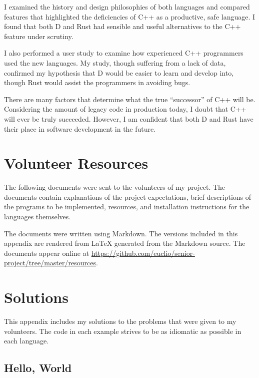 \documentclass[finalcopy]{srpaper}
\begin{document}
I examined the history and design philosophies of both languages and compared
features that highlighted the deficiencies of C++ as a productive, safe
language. I found that both D and Rust had sensible and useful alternatives to
the C++ feature under scrutiny.

I also performed a user study to examine how experienced C++ programmers
used the new languages. My study, though suffering from a lack of data,
confirmed my hypothesis that D would be easier to learn and develop into,
though Rust would assist the programmers in avoiding bugs.

There are many factors that determine what the true ``successor'' of C++ will
be. Considering the amount of legacy code in production today, I doubt that C++
will ever be truly succeeded. However, I am confident that both D and Rust have
their place in software development in the future.

\nocite{*}


\appendix \chapter{Volunteer Resources}\label{app:resources} The following
documents were sent to the volunteers of my project. The documents contain
explanations of the project expectations, brief descriptions of the programs to
be implemented, resources, and installation instructions for the languages
themselves.

The documents were written using Markdown. The versions included in this
appendix are rendered from \LaTeX{} generated from the Markdown source. The
documents appear online at
\url{https://github.com/euclio/senior-project/tree/master/resources}.

\clearpage

\clearpage

\clearpage


\chapter{Solutions}\label{app:solutions}
This appendix includes my solutions to the problems that were given to my
volunteers. The code in each example strives to be as idiomatic as possible in
each language.

\clearpage


\section{Hello, World}
\end{document}
